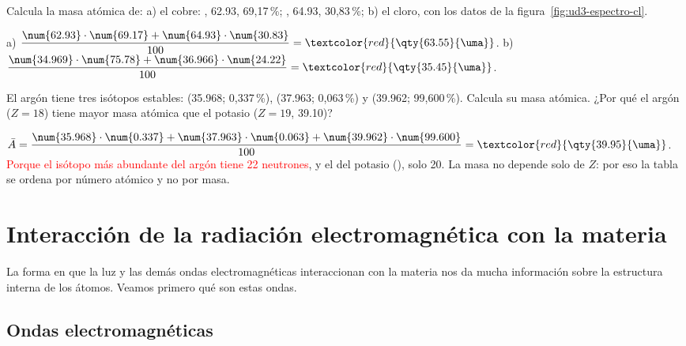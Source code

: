 \begin{exercise}
    Calcula la masa atómica de: a) el cobre: , \qty{62.93}{\uma}, 69,17\,\%; , \qty{64.93}{\uma},
    30,83\,\%; b) el cloro, con los datos de la figura~\ref{fig:ud3-espectro-cl}.
    \begin{solu}
        a) \(\dfrac{\num{62.93} \cdot \num{69.17} + \num{64.93} \cdot \num{30.83}}{100} = \textcolor{red}{\qty{63.55}{\uma}}\).
        b) \(\dfrac{\num{34.969} \cdot \num{75.78} + \num{36.966} \cdot \num{24.22}}{100} = \textcolor{red}{\qty{35.45}{\uma}}\).
    \end{solu}
\end{exercise}

\begin{exercise}
    El argón tiene tres isótopos estables:  (\qty{35.968}{\uma}; 0,337\,\%),  (\qty{37.963}{\uma};
    0,063\,\%) y  (\qty{39.962}{\uma}; 99,600\,\%). Calcula su masa atómica. ¿Por qué el argón (\(Z = 18\)) tiene
    mayor masa atómica que el potasio (\(Z = 19\), \qty{39.10}{\uma})?
    \begin{solu}
        \(\bar{A} = \dfrac{\num{35.968} \cdot \num{0.337} + \num{37.963} \cdot \num{0.063} + \num{39.962} \cdot \num{99.600}}{100} =
        \textcolor{red}{\qty{39.95}{\uma}}\). \textcolor{red}{Porque el isótopo más abundante del argón tiene 22 neutrones}, y el
        del potasio (), solo 20. La masa no depende solo de \(Z\): por eso la tabla se ordena por número atómico y no por
        masa.
    \end{solu}
\end{exercise}

\section{Interacción de la radiación electromagnética con la materia}\label{sec:ud3-radiacion}

La forma en que la luz y las demás ondas electromagnéticas interaccionan con la materia nos da mucha información sobre la
estructura interna de los átomos. Veamos primero qué son estas ondas.

\subsection{Ondas electromagnéticas}


